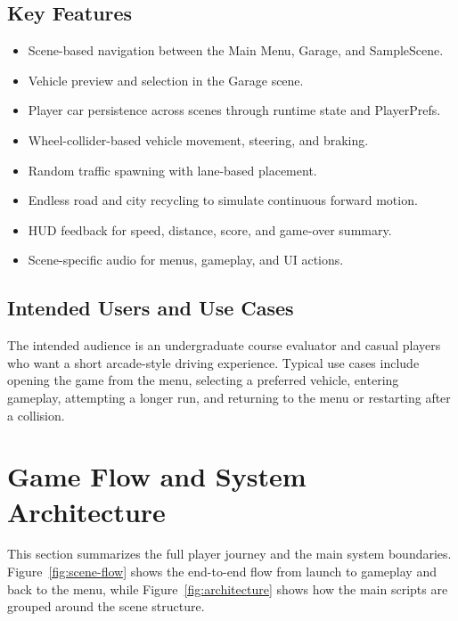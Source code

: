 \documentclass[12pt,a4paper]{article}
\begin{document}
\subsection{Key Features}
\begin{itemize}
    \item Scene-based navigation between the Main Menu, Garage, and SampleScene.
    \item Vehicle preview and selection in the Garage scene.
    \item Player car persistence across scenes through runtime state and PlayerPrefs.
    \item Wheel-collider-based vehicle movement, steering, and braking.
    \item Random traffic spawning with lane-based placement.
    \item Endless road and city recycling to simulate continuous forward motion.
    \item HUD feedback for speed, distance, score, and game-over summary.
    \item Scene-specific audio for menus, gameplay, and UI actions.
\end{itemize}

\subsection{Intended Users and Use Cases}
The intended audience is an undergraduate course evaluator and casual players who want a short arcade-style driving experience. Typical use cases include opening the game from the menu, selecting a preferred vehicle, entering gameplay, attempting a longer run, and returning to the menu or restarting after a collision.

\section{Game Flow and System Architecture}
This section summarizes the full player journey and the main system boundaries. Figure~\ref{fig:scene-flow} shows the end-to-end flow from launch to gameplay and back to the menu, while Figure~\ref{fig:architecture} shows how the main scripts are grouped around the scene structure.
\end{document}
